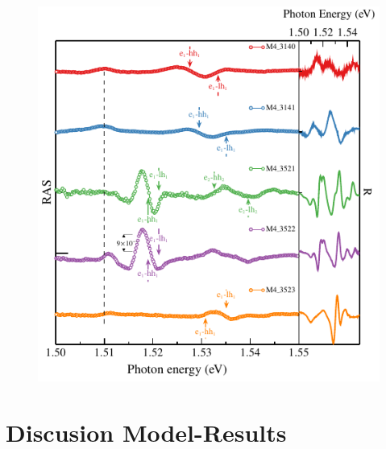\begin{figure}[ht!]
	\centering
	\includegraphics[width=\textwidth]{../figures/chapter-3/ras-plots/out/ras-set-2.pdf}
	\caption{ }
	\label{fig:chapter-3-subsec-ras-plots-set-2}
\end{figure}



\section{Discusion Model-Results}


















